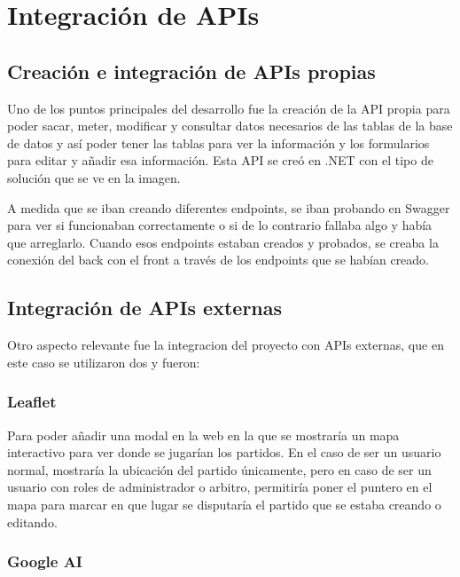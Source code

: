 \section{Integración de APIs}\label{integracion-apis}
\subsection{Creación e integración de APIs propias}

Uno de los puntos principales del desarrollo fue la creación de la API propia para poder sacar, meter, modificar y consultar datos necesarios de las tablas de la base de datos y así poder tener las tablas para ver la información y los formularios para editar y añadir esa información. Esta API se creó en .NET con el tipo de solución que se ve en la imagen.


A medida que se iban creando diferentes endpoints, se iban probando en Swagger para ver si funcionaban correctamente o si de lo contrario fallaba algo y había que arreglarlo. Cuando esos endpoints estaban creados y probados, se creaba la conexión del back con el front a través de los endpoints que se habían creado.

\subsection{Integración de APIs externas}

Otro aspecto relevante fue la integracion del proyecto con APIs externas, que en este caso se utilizaron dos y fueron:

\subsubsection{Leaflet}

Para poder añadir una modal en la web en la que se mostraría un mapa interactivo para ver donde se jugarían los partidos. En el caso de ser un usuario normal, mostraría la ubicación del partido únicamente, pero en caso de ser un usuario con roles de administrador o arbitro, permitiría poner el puntero en el mapa para marcar en que lugar se disputaría el partido que se estaba creando o editando.

\subsubsection{Google AI}


